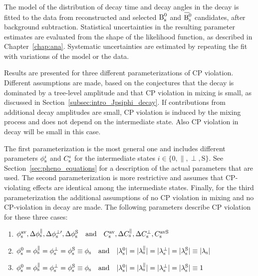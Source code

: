The model of the distribution of decay time and decay angles in the \BstoJpsiKK{} decay is fitted to the data from reconstructed and
selected $\Bs$ and $\Bsbar$ candidates, after background subtraction. Statistical uncertainties in the resulting parameter estimates are
evaluated from the shape of the likelihood function, as described in Chapter~\ref{chap:ana}. Systematic uncertainties are estimated by
repeating the fit with variations of the model or the data.

Results are presented for three different parameterizations of CP violation. Different assumptions are made, based on the conjectures that
the \BstoJpsiKK{} decay is dominated by a tree-level amplitude and that CP violation in mixing is small, as discussed in
Section~\ref{subsec:intro_Jpsiphi_decay}. If contributions from additional decay amplitudes are small, CP violation is induced by the
\BsBsbar{} mixing process and does not depend on the intermediate state. Also CP violation in decay will be small in this case.

The first parameterization is the most general one and includes different parameters $\phisi$ and $\Csi$ for the intermediate states
$i\in\{\text{0}, \parallel, \perp, \text{S}\}$. See Section~\ref{sec:pheno_equations} for a description of the actual parameters that are
used. The second parameterization is more restrictive and assumes that CP-violating effects are identical among the intermediate states.
Finally, for the third parameterization the additional assumptions of no CP violation in mixing and no CP-violation in decay are made. The
following parameters describe CP violation for these three cases:
\begin{enumerate}
  \item $\phisav,\Delphispara,\Delphisperpp,\DelphisS
         \quad\text{and}\quad\Csav,\DelCspara,\DelCsperp,\CsavS$
  \item $\phisi[\text{0}]=\phisi[\parallel]=\phisi[\perp]=\phisi[\text{S}]\equiv\phis
         \quad\text{and}\quad\lamsiAbs[\text{0}]=\lamsiAbs[\parallel]=\lamsiAbs[\perp]=\lamsiAbs[\text{S}]\equiv\lamsAbs$
  \item $\phisi[\text{0}]=\phisi[\parallel]=\phisi[\perp]=\phisi[\text{S}]\equiv\phis
         \quad\text{and}\quad\lamsiAbs[\text{0}]=\lamsiAbs[\parallel]=\lamsiAbs[\perp]=\lamsiAbs[\text{S}]\equiv1$
\end{enumerate}

